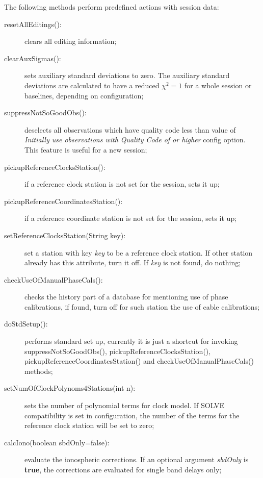 \documentclass [10pt,letterpaper]{report}
\begin{document}
The following methods perform predefined actions with session data:
\begin{description}
\item[resetAllEditings():] clears all editing information;

\item[clearAuxSigmas():] sets auxiliary standard deviations to zero. The auxiliary standard deviations are calculated
   to have a reduced $\chi^2=1$ for a whole session or baselines, depending on configuration;

\item[suppressNotSoGoodObs():] deselects all observations which have quality code less than value of {\sl Initially use
observations with Quality Code of or higher} config option. This feature is useful for a new session;

\item[pickupReferenceClocksStation():] if a reference clock station is not set for the session, sets it up;

\item[pickupReferenceCoordinatesStation():] if a reference coordinate station is not set for the session, sets it up;

\item[setReferenceClocksStation(String key):] set a station with key {\sl key} to be a reference clock station. If other
station already has this attribute, turn it off. If {\sl key} is not found, do nothing;

\item[checkUseOfManualPhaseCals():] checks the history part of a database for mentioning use of phase calibrations,
if found, turn off for such station the use of cable calibrations;

\item[doStdSetup():] performs standard set up, currently it is just a shortcut for invoking
suppressNotSoGoodObs(), pickupReferenceClocksStation(), pickupReferenceCoordinatesStation() and checkUseOfManualPhaseCals()
methods;

\item[setNumOfClockPolynoms4Stations(int n):] sets the number of polynomial terms for clock model. If SOLVE compatibility is
set in configuration, the number of the terms for the reference clock station will be set to zero;

\item[calcIono(boolean sbdOnly=false):] evaluate the ionospheric corrections. If an optional argument {\sl sbdOnly} is
{\bf true}, the corrections are evaluated for single band delays only;


\end{description}
\end{document}
